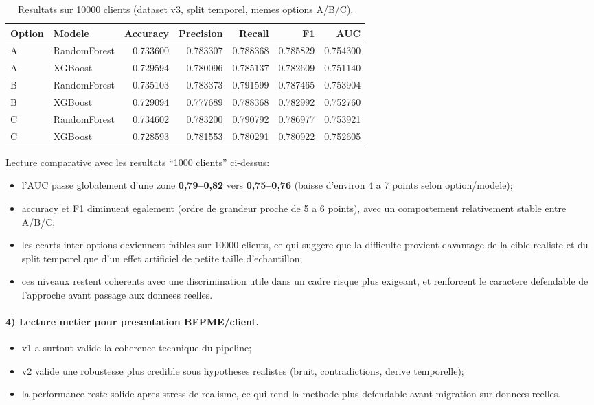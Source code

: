 \documentclass[11pt,a4paper]{article}
\begin{document}
\begin{table}[h]
  \centering
  \caption{Resultats sur 10000 clients (dataset v3, split temporel, memes options A/B/C).}
  \begin{tabular}{llrrrrr}
    \toprule
    Option & Modele & Accuracy & Precision & Recall & F1 & AUC \\
    \midrule
    A & RandomForest & 0.733600 & 0.783307 & 0.788368 & 0.785829 & 0.754300 \\
    A & XGBoost      & 0.729594 & 0.780096 & 0.785137 & 0.782609 & 0.751140 \\
    B & RandomForest & 0.735103 & 0.783373 & 0.791599 & 0.787465 & 0.753904 \\
    B & XGBoost      & 0.729094 & 0.777689 & 0.788368 & 0.782992 & 0.752760 \\
    C & RandomForest & 0.734602 & 0.783200 & 0.790792 & 0.786977 & 0.753921 \\
    C & XGBoost      & 0.728593 & 0.781553 & 0.780291 & 0.780922 & 0.752605 \\
    \bottomrule
  \end{tabular}
\end{table}

Lecture comparative avec les resultats ``1000 clients'' ci-dessus:
\begin{itemize}[leftmargin=1.2cm]
  \item l'AUC passe globalement d'une zone \textbf{0,79--0,82} vers \textbf{0,75--0,76} (baisse d'environ 4 a 7 points selon option/modele);
  \item accuracy et F1 diminuent egalement (ordre de grandeur proche de 5 a 6 points), avec un comportement relativement stable entre A/B/C;
  \item les ecarts inter-options deviennent faibles sur 10000 clients, ce qui suggere que la difficulte provient davantage de la cible realiste et du split temporel que d'un effet artificiel de petite taille d'echantillon;
  \item ces niveaux restent coherents avec une discrimination utile dans un cadre risque plus exigeant, et renforcent le caractere defendable de l'approche avant passage aux donnees reelles.
\end{itemize}

\paragraph{4) Lecture metier pour presentation BFPME/client.}
\begin{itemize}[leftmargin=1.2cm]
  \item v1 a surtout valide la coherence technique du pipeline;
  \item v2 valide une robustesse plus credible sous hypotheses realistes (bruit, contradictions, derive temporelle);
  \item la performance reste solide apres stress de realisme, ce qui rend la methode plus defendable avant migration sur donnees reelles.
\end{itemize}
\end{document}
